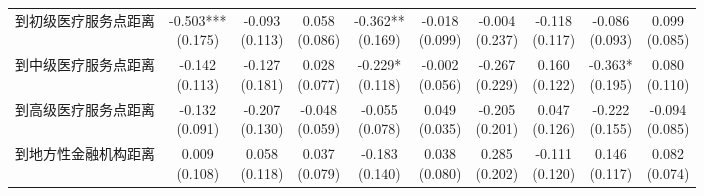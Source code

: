 \documentclass[a4paper,12pt]{report}
\begin{document}
\begin{table}[H]
{\begin{tabular}{lccccccccc}
到初级医疗服务点距离 & \makecell{-0.503***\\(0.175)} & \makecell{-0.093\\(0.113)} & \makecell{0.058\\(0.086)} & \makecell{-0.362**\\(0.169)} & \makecell{-0.018\\(0.099)} & \makecell{-0.004\\(0.237)} & \makecell{-0.118\\(0.117)} & \makecell{-0.086\\(0.093)} & \makecell{0.099\\(0.085)} \\
到中级医疗服务点距离 & \makecell{-0.142\\(0.113)} & \makecell{-0.127\\(0.181)} & \makecell{0.028\\(0.077)} & \makecell{-0.229*\\(0.118)} & \makecell{-0.002\\(0.056)} & \makecell{-0.267\\(0.229)} & \makecell{0.160\\(0.122)} & \makecell{-0.363*\\(0.195)} & \makecell{0.080\\(0.110)} \\
到高级医疗服务点距离 & \makecell{-0.132\\(0.091)} & \makecell{-0.207\\(0.130)} & \makecell{-0.048\\(0.059)} & \makecell{-0.055\\(0.078)} & \makecell{0.049\\(0.035)} & \makecell{-0.205\\(0.201)} & \makecell{0.047\\(0.126)} & \makecell{-0.222\\(0.155)} & \makecell{-0.094\\(0.085)} \\
到地方性金融机构距离 & \makecell{0.009\\(0.108)} & \makecell{0.058\\(0.118)} & \makecell{0.037\\(0.079)} & \makecell{-0.183\\(0.140)} & \makecell{0.038\\(0.080)} & \makecell{0.285\\(0.202)} & \makecell{-0.111\\(0.120)} & \makecell{0.146\\(0.117)} & \makecell{0.082\\(0.074)} \\

\end{tabular}}
\end{table}
\end{document}
